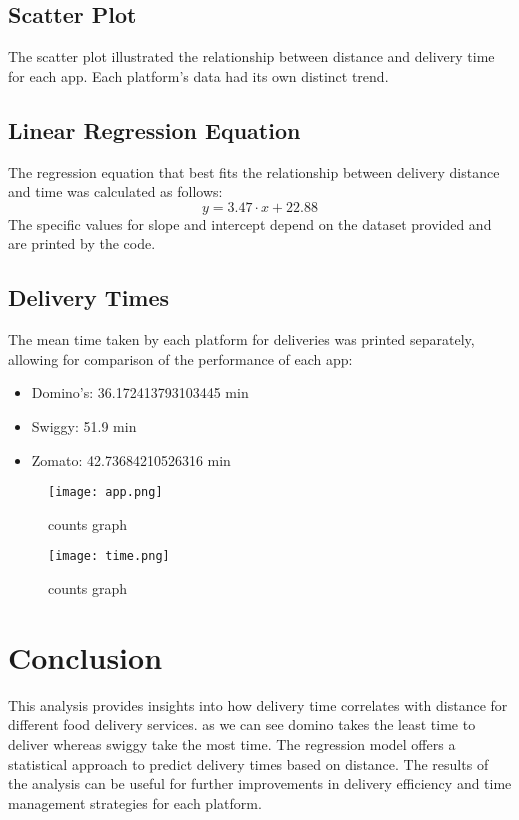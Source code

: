 \documentclass[12pt]{article}
\begin{document}
\subsection*{Scatter Plot}
The scatter plot illustrated the relationship between distance and delivery time for each app. Each platform’s data had its own distinct trend.

\subsection*{Linear Regression Equation}
The regression equation that best fits the relationship between delivery distance and time was calculated as follows:
\[
y = \text{3.47} \cdot x + \text{22.88}
\]
The specific values for slope and intercept depend on the dataset provided and are printed by the code.

\subsection*{Delivery Times}
The mean time taken by each platform for deliveries was printed separately, allowing for comparison of the performance of each app:
\begin{itemize}
    \item Domino’s: 36.172413793103445 min
    \item Swiggy: 51.9 min
    \item Zomato: 42.73684210526316 min
\end{itemize}
\begin{figure}[h]
    \centering
    \texttt{[image: app.png]}
    \caption{counts graph}
    \label{fig:label}
\end{figure}
\begin{figure}[h]
    \centering
    \texttt{[image: time.png]}
    \caption{counts graph}
    \label{fig:label}
\end{figure}
\section*{Conclusion}

This analysis provides insights into how delivery time correlates with distance for different food delivery services.
as we can see domino takes the least time to deliver whereas swiggy take the most time.
The regression model offers a statistical approach to predict delivery times based on distance. The results of the analysis can be useful for further improvements in delivery efficiency and time management strategies for each platform.
\end{document}

